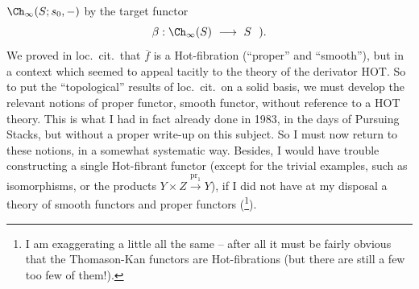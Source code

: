 $\Ch_{\infty}(S; s_0, -)$ by the target functor
\[
\beta : \Ch_{\infty}(S) \ \longrightarrow\ S \ \ ).
\]
We proved in loc.\ cit.\ that $\overline{f}$ is a Hot-fibration (``proper'' and ``smooth''), but in a context which seemed to appeal tacitly to the theory of the derivator HOT. So to put the ``topological'' results of loc.\ cit.\ on a solid basis, we must develop the relevant notions of proper functor, smooth functor, without reference to a HOT theory. This is what I had in fact already done in 1983, in the days of Pursuing Stacks, but without a proper write-up on this subject. So I must now return to these notions, in a somewhat systematic way. Besides, I would have trouble constructing a single Hot-fibrant functor (except for the trivial examples, such as isomorphisms, or the products $Y \times Z \xrightarrow{\mathrm{pr}_1} Y$), if I did not have at my disposal a theory of smooth functors and proper functors (\footnote{I am exaggerating a little all the same -- after all it must be fairly obvious that the Thomason-Kan functors are Hot-fibrations (but there are still a few too few of them!).}). %